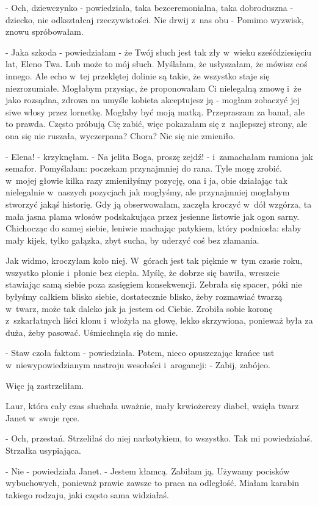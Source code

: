 \documentclass[oneside,polish,12pt,sfheadings]{mwbk}
\begin{document}
- Och, dziewczynko - powiedziała, taka bezceremonialna, taka dobroduszna
- dziecko, nie odkształcaj rzeczywistości. Nie drwij z~nas obu - Pomimo
wyzwisk, znowu spróbowałam.

- Jaka szkoda - powiedziałam - że Twój słuch jest tak zły w~wieku
sześćdziesięciu lat, Eleno Twa. Lub może to mój słuch. Myślałam, że
usłyszałam, że mówisz coś innego. Ale echo w~tej przeklętej dolinie
są takie, że wszystko staje się niezrozumiałe. Mogłabym przysiąc,
że proponowałam Ci nielegalną zmowę i~że jako rozsądna, zdrowa na
umyśle kobieta akceptujesz ją - mogłam zobaczyć jej siwe włosy przez
lornetkę. Mogłaby być moją matką. Przepraszam za banał, ale to prawda.
Często próbują Cię zabić, więc pokazałam się z~najlepszej strony,
ale ona się nie ruszała, wyczerpana? Chora? Nic się nie zmieniło.

- Elena! - krzyknęłam. - Na jelita Boga, proszę zejdź! - i~zamachałam
ramiona jak semafor. Pomyślałam: poczekam przynajmniej do rana. Tyle
mogę zrobić. w~mojej głowie kilka razy zmieniłyśmy pozycję, ona i
ja, obie działając tak nielegalnie w~naszych pozycjach jak mogłyśmy,
ale przynajmniej mogłabym stworzyć jakąś historię. Gdy ją obserwowałam,
zaczęła kroczyć w~dół wzgórza, ta mała jasna plama włosów podskakująca
przez jesienne listowie jak ogon sarny. Chichocząc do samej siebie,
leniwie machając patykiem, który podniosła: słaby mały kijek, tylko
gałązka, zbyt sucha, by uderzyć coś bez złamania.

Jak widmo, kroczyłam koło niej. W~górach jest tak pięknie w~tym czasie
roku, wszystko płonie i~płonie bez ciepła. Myślę, że dobrze się bawiła,
wreszcie stawiając samą siebie poza zasięgiem konsekwencji. Zebrała
się spacer, póki nie byłyśmy całkiem blisko siebie, dostatecznie blisko,
żeby rozmawiać twarzą w~twarz, może tak daleko jak ja jestem od Ciebie.
Zrobiła sobie koronę z~szkarłatnych liści klonu i~włożyła na głowę,
lekko skrzywiona, ponieważ była za duża, żeby pasować. Uśmiechnęła
się do mnie.

- Staw czoła faktom - powiedziała. Potem, nieco opuszczając krańce
ust w~niewypowiedzianym nastroju wesołości i~arogancji: - Zabij, zabójco.

Więc ją zastrzeliłam.

Laur, która cały czas słuchała uważnie, mały krwiożerczy diabeł, wzięła
twarz Janet w~swoje ręce. 

- Och, przestań. Strzeliłaś do niej narkotykiem, to wszystko. Tak mi powiedziałaś. Strzałka usypiająca.

- Nie - powiedziała Janet. - Jestem kłamcą. Zabiłam ją. Używamy pocisków
wybuchowych, ponieważ prawie zawsze to praca na odległość. Miałam
karabin takiego rodzaju, jaki często sama widziałaś.
\end{document}
